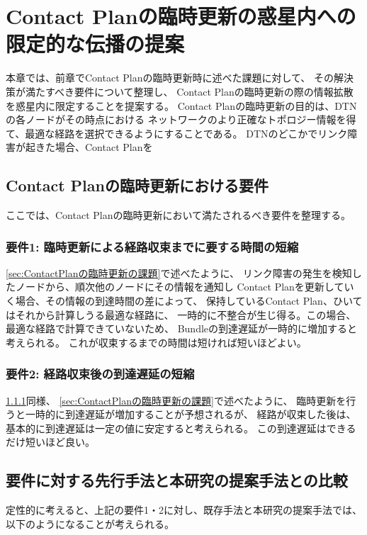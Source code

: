 \chapter{Contact Planの臨時更新の惑星内への限定的な伝播の提案}
\label{chap:suggestion}
本章では、前章でContact Planの臨時更新時に述べた課題に対して、
その解決策が満たすべき要件について整理し、
Contact Planの臨時更新の際の情報拡散を惑星内に限定することを提案する。
Contact Planの臨時更新の目的は、DTNの各ノードがその時点における
ネットワークのより正確なトポロジー情報を得て、最適な経路を選択できるようにすることである。
DTNのどこかでリンク障害が起きた場合、Contact Planを



\section{Contact Planの臨時更新における要件}
ここでは、Contact Planの臨時更新において満たされるべき要件を整理する。

\subsection{要件1: 臨時更新による経路収束までに要する時間の短縮}
\label{subsection:要件1}
\ref{sec:ContactPlanの臨時更新の課題}で述べたように、
リンク障害の発生を検知したノードから、順次他のノードにその情報を通知し
Contact Planを更新していく場合、その情報の到達時間の差によって、
保持しているContact Plan、ひいてはそれから計算しうる最適な経路に、
一時的に不整合が生じ得る。この場合、最適な経路で計算できていないため、
Bundleの到達遅延が一時的に増加すると考えられる。
これが収束するまでの時間は短ければ短いほどよい。

\subsection{要件2: 経路収束後の到達遅延の短縮}
\label{subsection:要件2}
\ref{subsection:要件1}同様、
\ref{sec:ContactPlanの臨時更新の課題}で述べたように、
臨時更新を行うと一時的に到達遅延が増加することが予想されるが、
経路が収束した後は、基本的に到達遅延は一定の値に安定すると考えられる。
この到達遅延はできるだけ短いほど良い。

\section{要件に対する先行手法と本研究の提案手法との比較}
定性的に考えると、上記の要件1・2に対し、既存手法と本研究の提案手法では、
以下のようになることが考えられる。

